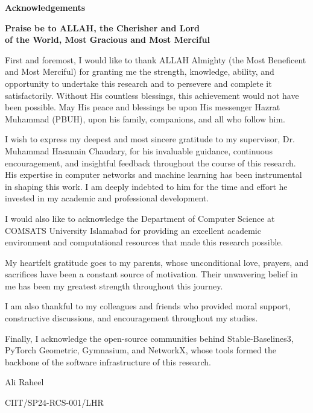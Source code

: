\newpage
\begin{center}
\LARGE\textbf{{Acknowledgements}}\\
\end{center}
\vspace{0.3in}
\begin{center}
\textbf{Praise be to ALLAH, the Cherisher and Lord\\of the World, Most Gracious
and Most Merciful}
\end{center}
\normalsize{First and foremost, I would like to thank ALLAH Almighty (the Most
Beneficent and Most Merciful) for granting me the strength, knowledge, ability,
and opportunity to undertake this research and to persevere and complete it
satisfactorily. Without His countless blessings, this achievement would not have
been possible. May His peace and blessings be upon His messenger Hazrat Muhammad
(PBUH), upon his family, companions, and all who follow him.

I wish to express my deepest and most sincere gratitude to my supervisor, Dr.
Muhammad Hasanain Chaudary, for his invaluable guidance, continuous
encouragement, and insightful feedback throughout the course of this research.
His expertise in computer networks and machine learning has been instrumental in
shaping this work. I am deeply indebted to him for the time and effort he
invested in my academic and professional development.

I would also like to acknowledge the Department of Computer Science at COMSATS
University Islamabad for providing an excellent academic environment and
computational resources that made this research possible.

My heartfelt gratitude goes to my parents, whose unconditional love, prayers,
and sacrifices have been a constant source of motivation. Their unwavering
belief in me has been my greatest strength throughout this journey.

I am also thankful to my colleagues and friends who provided moral support,
constructive discussions, and encouragement throughout my studies.

Finally, I acknowledge the open-source communities behind Stable-Baselines3,
PyTorch Geometric, Gymnasium, and NetworkX, whose tools formed the backbone of
the software infrastructure of this research.}

\vspace{0.5in}
\hspace{265pt}Ali Raheel

\hspace{240pt}CIIT/SP24-RCS-001/LHR
